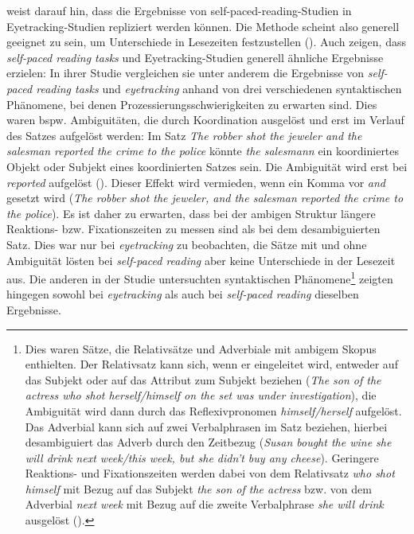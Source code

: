 \textcite[25]{Mitchel.2013} weist darauf hin, dass die Ergebnisse von self-paced-reading-Studien in Eyetracking-Studien repliziert werden können. Die Methode scheint also generell geeignet zu sein, um Unterschiede in Lesezeiten festzustellen (\cite[25]{Mitchel.2013}). Auch \textcite[123--126]{Witzel.2012} zeigen, dass \textit{self-paced reading tasks} und Eyetracking-Studien generell ähnliche Ergebnisse erzielen:  In ihrer Studie vergleichen sie unter anderem die Ergebnisse von \textit{self-paced reading tasks} und \textit{eyetracking} anhand von drei verschiedenen syntaktischen Phänomene, bei denen Prozessierungsschwierigkeiten zu erwarten sind. Dies waren bspw. Ambiguitäten, die durch Koordination ausgelöst und erst im Verlauf des Satzes aufgelöst werden: Im Satz \textit{The robber shot the jeweler and the salesman reported the crime to the police} könnte \textit{the salesmann} ein koordiniertes Objekt oder Subjekt eines koordinierten Satzes sein. Die Ambiguität wird erst bei \textit{reported} aufgelöst (\cite[111]{Witzel.2012}). Dieser Effekt wird vermieden, wenn ein Komma vor \textit{and} gesetzt wird (\textit{The robber shot the jeweler, and the salesman reported the crime to the police}). Es ist daher zu erwarten, dass bei der ambigen Struktur längere Reaktions- bzw. Fixationszeiten zu messen sind als bei dem desambiguierten Satz. Dies war nur bei \textit{eyetracking} zu beobachten, die Sätze mit und ohne Ambiguität lösten bei \textit{self-paced reading} aber keine Unterschiede in der Lesezeit aus. Die anderen in der Studie untersuchten syntaktischen Phänomene\footnote{Dies waren Sätze, die Relativsätze und Adverbiale mit ambigem Skopus enthielten. Der Relativsatz kann sich, wenn er eingeleitet wird, entweder auf das Subjekt oder auf das Attribut zum Subjekt beziehen (\textit{The son of the actress who shot herself/himself on the set was under investigation}), die Ambiguität wird dann durch das Reflexivpronomen \textit{himself/herself} aufgelöst. Das Adverbial kann sich auf zwei Verbalphrasen im Satz beziehen, hierbei desambiguiert das Adverb durch den Zeitbezug (\textit{Susan bought the wine she will drink next week/this week, but she didn't buy any cheese}). Geringere Reaktions- und Fixationszeiten werden dabei von dem Relativsatz \textit{who shot himself} mit Bezug auf das Subjekt \textit{the son of the actress} bzw. von dem Adverbial \textit{next week} mit Bezug auf die zweite Verbalphrase \textit{she will drink} ausgelöst (\cite[115--120]{Witzel.2012}).} zeigten hingegen sowohl bei \textit{eyetracking} als auch bei \textit{self-paced reading} dieselben Ergebnisse.    

